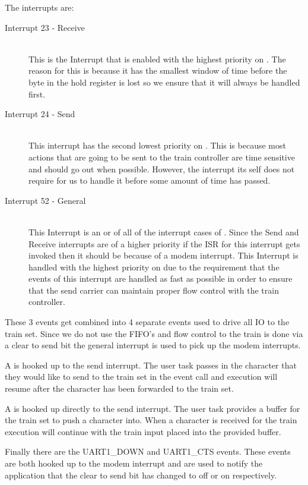 \documentclass[pdftex,10pt,a4paper]{article}
\begin{document}
The interrupts are:
\begin{description}
\item[Interrupt 23 -  Receive] \hfill \\
	This is the Interrupt that is enabled with the highest priority on
	. The reason for this is because it has the smallest window
	of time before the byte in the hold register is lost so we ensure that
	it will always be handled first.
\item[Interrupt 24 -  Send] \hfill \\
	This interrupt has the second lowest priority on . This is
	because most actions that are going to be sent to the train controller
	are time sensitive and should go out when possible. However, the
	interrupt its self does not require for us to handle it before some
	amount of time has passed.
\item[Interrupt 52 -  General] \hfill \\
	This Interrupt is an or of all of the interrupt cases of .
	Since the  Send and Receive interrupts are of a higher
	priority if the ISR for this interrupt gets invoked then it should be
	because of a modem interrupt. This Interrupt is handled with the
	highest priority on  due to the requirement that the events
	of this interrupt are handled as fast as possible in order to ensure
	that the  send carrier can maintain proper flow control
	with the train controller.
\end{description}

These 3 events get combined into 4 separate events used to drive all IO to the
train set. Since we do not use the FIFO's and flow control to the train is done
via a clear to send bit the general interrupt is used to pick up the modem
interrupts.

A  is hooked up to the  send interrupt. The user
task passes in the character that they would like to send to the train set
in the event call and execution will resume after the character has been
forwarded to the train set.

A  is hooked up directly to the  send interrupt.
The user task provides a buffer for the train set to push a character into.
When a character is received for the train execution will continue with the
train input placed into the provided buffer.

Finally there are the {UART1\_DOWN} and {UART1\_CTS} events. These events
are both hooked up to the  modem interrupt and are used to notify
the application that the clear to send bit has changed to off or on
respectively.
\end{document}
